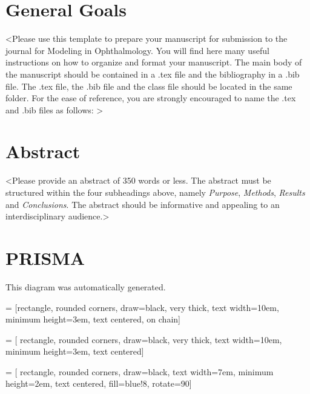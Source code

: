\documentclass{qqtarticle}
\begin{document}
\qqtMakeFrontpage


    \section{General Goals}

    <Please use this template to prepare your manuscript for submission to the
    journal for Modeling in Ophthalmology.  You will find here many useful
    instructions on how to organize and format your manuscript.  The main body of
    the manuscript should be contained in a .tex file and the bibliography in a
    .bib file.  The .tex file, the .bib file and the class file should be located in the
    same folder.  For the ease of reference, you are strongly encouraged to name
    the .tex and .bib files as follows: >


    \section{Abstract}
    <Please provide an abstract of 350 words or less. The abstract must be
    structured within the four subheadings above, namely \textit{Purpose},
    \textit{Methods}, \textit{Results} and \textit{Conclusions}. The abstract
    should be informative and appealing to an interdisciplinary audience.>



    \section{PRISMA}
    This diagram was automatically generated.

     = [rectangle, rounded corners, draw=black, very thick, text width=10em, minimum height=3em, text centered, on chain]

     = [ rectangle, rounded corners, draw=black, very thick, text width=10em, minimum height=3em, text centered] %

     = [ rectangle, rounded corners, draw=black, text width=7em, minimum height=2em, text centered, fill=blue!8, rotate=90]

\end{document}
